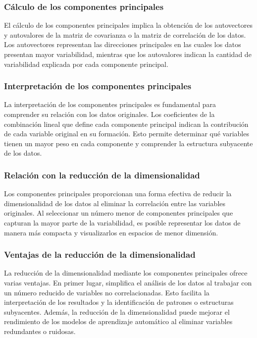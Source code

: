 \documentclass{article}
\begin{document}
\subsubsection{Cálculo de los componentes principales}
El cálculo de los componentes principales implica la obtención de los autovectores y autovalores de la matriz de covarianza o la matriz de correlación de los datos. Los autovectores representan las direcciones principales en las cuales los datos presentan mayor variabilidad, mientras que los autovalores indican la cantidad de variabilidad explicada por cada componente principal.

\subsubsection{Interpretación de los componentes principales}
La interpretación de los componentes principales es fundamental para comprender su relación con los datos originales. Los coeficientes de la combinación lineal que define cada componente principal indican la contribución de cada variable original en su formación. Esto permite determinar qué variables tienen un mayor peso en cada componente y comprender la estructura subyacente de los datos.

\subsubsection{Relación con la reducción de la dimensionalidad}
Los componentes principales proporcionan una forma efectiva de reducir la dimensionalidad de los datos al eliminar la correlación entre las variables originales. Al seleccionar un número menor de componentes principales que capturan la mayor parte de la variabilidad, es posible representar los datos de manera más compacta y visualizarlos en espacios de menor dimensión.

\subsubsection{Ventajas de la reducción de la dimensionalidad}
La reducción de la dimensionalidad mediante los componentes principales ofrece varias ventajas. En primer lugar, simplifica el análisis de los datos al trabajar con un número reducido de variables no correlacionadas. Esto facilita la interpretación de los resultados y la identificación de patrones o estructuras subyacentes. Además, la reducción de la dimensionalidad puede mejorar el rendimiento de los modelos de aprendizaje automático al eliminar variables redundantes o ruidosas.
\end{document}
